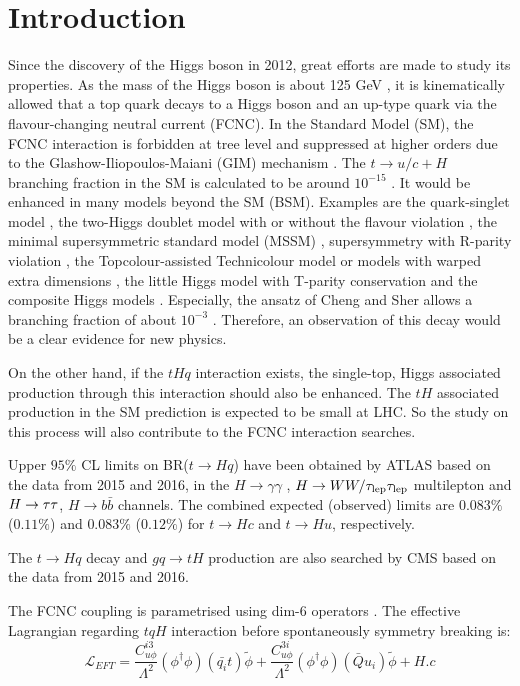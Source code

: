 \section{Introduction}
Since the discovery of the Higgs boson in 2012, great efforts are made to study its properties. As the mass of the Higgs boson is about 125 GeV \cite{HiggsMass}, it is kinematically allowed that a top quark decays to a Higgs boson and an up-type quark via the flavour-changing neutral current (FCNC). In the Standard Model (SM), the FCNC interaction is forbidden at tree level and suppressed at higher orders due to the Glashow-Iliopoulos-Maiani (GIM) mechanism \cite{GIM}. The $t\to u/c+H$ branching fraction in the SM is calculated to be around $10^{-15}$ \cite{brtch3}. It would be enhanced in many models beyond the SM (BSM). Examples are the quark-singlet model \cite{quarkSinglet1,quarkSinglet2}, the two-Higgs doublet model with or without the flavour violation \cite{2hdm1,2hdm2}, the minimal supersymmetric standard model (MSSM) \cite{2hdm3}, supersymmetry with R-parity violation \cite{Rparity},
the Topcolour-assisted Technicolour model \cite{Techni} or models with warped extra dimensions \cite{extraD}, the little Higgs model with T-parity conservation \cite{littleH} and the composite Higgs models \cite{compositeH}.
Especially, the ansatz of Cheng and Sher \cite{Sher} allows a branching fraction of about $10^{-3}$ \cite{FCNC_rate}. Therefore, an observation of this decay would be a clear evidence for new physics.

On the other hand, if the $tHq$ interaction exists, the single-top, Higgs associated production through this interaction should also be enhanced. The $tH$ associated production in the SM prediction is expected to be small at LHC\cite{tHjb_production}. So the study on this process will also contribute to the FCNC interaction searches.

Upper $95\%$ CL limits on BR($t\to Hq$) have been obtained by ATLAS based on the data from 2015 and 2016, in the $H\to\gamma\gamma$ \cite{fcncgmgm}, $H\to WW/\tau_\text{lep}{}\tau_\text{lep}$ multilepton \cite{fcncml} and  $H \rightarrow \tau\tau$, $H\to b\bar{b}$ \cite{fcnctautau} channels. The combined expected (observed) limits are $0.083\%$ ($0.11\%$) and $0.083\%$ ($0.12\%$) for $t\to Hc$ and $t\to Hu$, respectively.

The $t\to Hq$ decay and $gq\to tH$ production are also searched by CMS based on the data from 2015 and 2016\cite{CMS-TOP-17-003}. 

The FCNC coupling is parametrised using dim-6 operators \cite{fcnc_production_theory}. The effective Lagrangian regarding $tqH$ interaction before spontaneously symmetry breaking is:
%
\begin{equation}
\mathcal{L}_{EFT} = \frac{C^{i3}_{u\phi}}{\Lambda^{2}}(\phi^{\dagger}\phi)(\bar{q_{i}}t)\tilde{\phi} + \frac{C^{3i}_{u\phi}}{\Lambda^{2}}(\phi^{\dagger}\phi)(\bar{Q}u_{i})\tilde{\phi} + H.c
\label{eq:eq01}
\end{equation}
%

